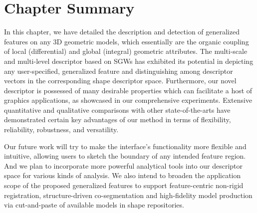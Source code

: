 \section{Chapter Summary}
\label{sec:Con}

In this chapter, we have detailed the description and detection of
generalized features on any 3D geometric models, which essentially are
the organic coupling of local (differential) and global (integral)
geometric attributes. The multi-scale and multi-level descriptor based
on SGWs has exhibited its potential in depicting any user-specified,
generalized feature and distinguishing among descriptor vectors in the
corresponding shape descriptor space. Furthermore, our novel
descriptor is possessed of many desirable properties
which can facilitate a host of graphics applications, as showcased in
our comprehensive experiments. Extensive quantitative and qualitative
comparisons with other state-of-the-arts have demonstrated certain key
advantages of our method in terms of flexibility, reliability,
robustness, and versatility.

Our future work will try to make the interface's functionality more
flexible and intuitive, allowing users to sketch the boundary of any
intended feature region. And we plan to incorporate
more powerful analytical tools into our descriptor space for various
kinds of analysis. We also intend to broaden the application scope of
the proposed generalized features to support feature-centric non-rigid
registration, structure-driven co-segmentation and high-fidelity model
production via cut-and-paste of available models in shape repositories. 